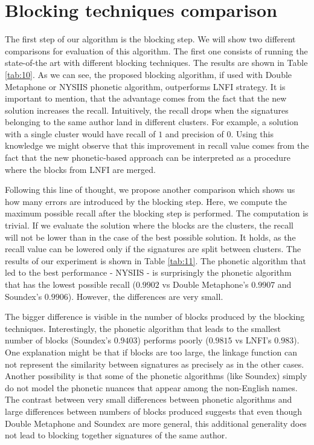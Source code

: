 \documentclass{pracamgr}
\begin{document}
\section{Blocking techniques comparison}
The first step of our algorithm is the blocking step. We will show two different comparisons
for evaluation of this algorithm. The first one consists of running the state-of-the art with
different blocking techniques. The results are shown in Table \ref{tab:10}.
As we can see, the proposed blocking algorithm, if used with
Double Metaphone or NYSIIS phonetic algorithm, outperforms LNFI strategy.
It is important to mention, that the advantage comes from the fact that the
new solution increases the recall. Intuitively, the recall drops when the
signatures belonging to the same author land in different clusters.
For example, a solution with a single cluster would have recall of $1$ and
precision of $0$. Using this knowledge we might observe that this improvement
in recall value comes from the fact that the new phonetic-based approach can
be interpreted as a procedure where the blocks from LNFI are merged.

Following this line of thought, we propose another comparison which shows us how
many errors are introduced by the blocking step.
Here, we compute the maximum possible recall after
the blocking step is performed. The computation is trivial. If we
evaluate the solution where the blocks are the clusters, the recall will not be lower than
in the case of the best possible solution. It holds, as the recall value can be lowered
only if the signatures are split between clusters. The results of our
experiment is shown in Table \ref{tab:11}. The phonetic algorithm that led to
the best performance - NYSIIS - is surprisingly the phonetic algorithm that has
the lowest possible recall ($0.9902$ vs Double Metaphone's $0.9907$ and 
Soundex's $0.9906$). However, the differences are very small.

The bigger difference is visible in the number of blocks produced by the
blocking techniques. Interestingly, the phonetic algorithm that leads to the
smallest number of blocks
(Soundex's $0.9403$) performs poorly ($0.9815$ vs LNFI's $0.983$).
One explanation might be that if blocks are too large, the linkage function can
not represent the similarity between signatures as precisely as in the other cases.
Another possibility is that some of the phonetic algorithms (like Soundex)
simply do not model the phonetic nuances that appear among the non-English names.
The contrast between very small differences between phonetic algorithms
and large differences between numbers of blocks produced suggests that
even though Double Metaphone and Soundex are more general, this additional
generality does not lead to blocking together signatures of the same author.
\end{document}
